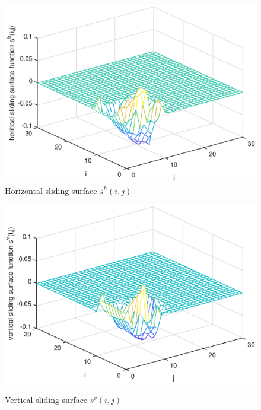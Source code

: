 \documentclass[conference]{IEEEtran}
\begin{document}
\begin{figure}[!htb]
	\centering\includegraphics[scale=0.6]{./simulations/hs_eps.eps}
	\caption{Horizontal  sliding surface $s^{h}(i,j)$}
	\label{fig9}
\end{figure}
\begin{figure}[!htb]
	\centering\includegraphics[scale=0.6]{./simulations/vs_eps.eps}\\ 
	\caption{Vertical sliding surface $s^{v}(i,j)$}
	\label{fig10}
\end{figure}
\end{document}
